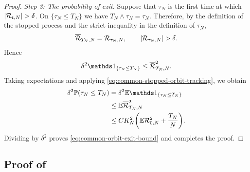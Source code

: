 \documentclass[11pt,reqno,a4paper]{article}
\newcommand{\Pp}{\P}
\newcommand{\Ee}{\E}
\begin{document}
\begin{proof}
  \emph{Step 3: The probability of exit.}
  Suppose that $\tau_N$ is the first time at which
  $\abs{\mathcal R_{t,N}}>\delta$. On $\{\tau_N\leq T_N\}$ we have
  $T_N\wedge\tau_N=\tau_N$. Therefore, by the definition of
  the stopped process and the strict inequality in the definition of
  $\tau_N$,
  \begin{equation*}
    \overline{\mathcal R}_{T_N,N}
    =\mathcal R_{\tau_N,N},
    \qquad
    \abs{\mathcal R_{\tau_N,N}}>\delta.
  \end{equation*}
  Hence
  \begin{equation*}
    \delta^2\one_{\{\tau_N\leq T_N\}}
    \leq
    \overline{\mathcal R}_{T_N,N}^2.
  \end{equation*}
  Taking expectations and applying
  \cref{eq:common-stopped-orbit-tracking}, we obtain
  \begin{align*}
    \delta^2\Pp(\tau_N\leq T_N)
    &=
    \delta^2\Ee\one_{\{\tau_N\leq T_N\}}
    \\
    &\leq
    \Ee\overline{\mathcal R}_{T_N,N}^2
    \\
    &\leq
    CK_N^2\left(
      \Ee\mathcal R_{0,N}^2+\frac{T_N}{N}
    \right).
  \end{align*}
  Dividing by $\delta^2$ proves \cref{eq:common-orbit-exit-bound} and
  completes the proof.
\end{proof}

\subsection{Proof of
\texorpdfstring{}
{Lemma~\ref{lem:negative-drift-affine-entrance}}}
\label{app:common-affine-entrance}
\end{document}

